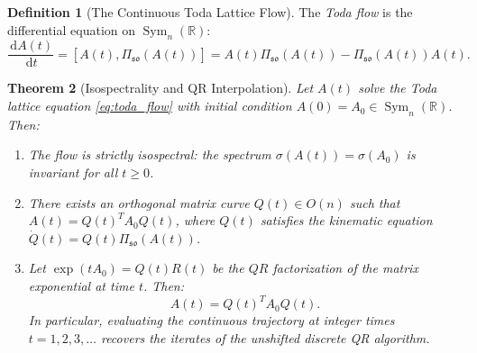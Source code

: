 \documentclass[11pt,a4paper,reqno]{amsart}
\newtheorem{theorem}{Theorem}[section]
\theoremstyle{definition}
\newtheorem{definition}[theorem]{Definition}
\numberwithin{equation}{section}
\providecommand{\R}{\mathbb{R}}
\newcommand{\dif}{\,\mathrm{d}}
\providecommand{\R}{\mathbb{R}}
\begin{document}
\begin{definition}[The Continuous Toda Lattice Flow]
The \emph{Toda flow} is the differential equation on $\operatorname{Sym}_n(\R)$:
\begin{equation}
    \label{eq:toda_flow}
    \frac{\dif A(t)}{\dif t} = [A(t), \Pi_{\mathfrak{so}}(A(t))] = A(t) \Pi_{\mathfrak{so}}(A(t)) - \Pi_{\mathfrak{so}}(A(t)) A(t).
\end{equation}
\end{definition}

\begin{theorem}[Isospectrality and QR Interpolation]
\label{thm:toda_qr}
Let $A(t)$ solve the Toda lattice equation \eqref{eq:toda_flow} with initial condition $A(0) = A_0 \in \operatorname{Sym}_n(\R)$. Then:
\begin{enumerate}[label=(\roman*)]
    \item The flow is \emph{strictly isospectral}: the spectrum $\sigma(A(t)) = \sigma(A_0)$ is invariant for all $t \ge 0$.
    \item There exists an orthogonal matrix curve $Q(t) \in O(n)$ such that $A(t) = Q(t)^T A_0 Q(t)$, where $Q(t)$ satisfies the kinematic equation $\dot{Q}(t) = Q(t) \Pi_{\mathfrak{so}}(A(t))$.
    \item Let $\exp(t A_0) = Q(t) R(t)$ be the $QR$ factorization of the matrix exponential at time $t$. Then:
    \begin{equation}
        A(t) = Q(t)^T A_0 Q(t).
    \end{equation}
    In particular, evaluating the continuous trajectory at integer times $t = 1, 2, 3, \dots$ recovers the iterates of the unshifted discrete QR algorithm.
\end{enumerate}
\end{theorem}
\end{document}
